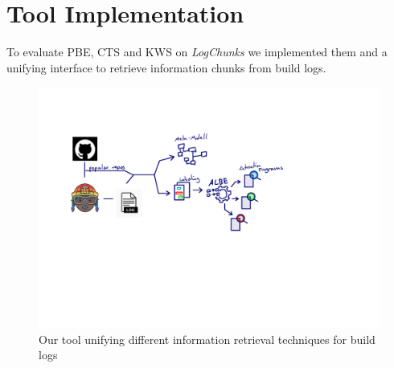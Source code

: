 \documentclass[\myrootdir/main.tex]{subfiles}
\begin{document}
\chapter{Tool Implementation}
\label{sec:implementation}
To evaluate PBE, CTS and KWS on \emph{LogChunks} we implemented them and a unifying interface to retrieve information chunks from build logs.

\begin{figure}[h]
	\centering
	\includegraphics[page=7, width=\textwidth, trim={0.5cm 0.5cm 0.5cm 0.5cm}, clip]{img/flow-of-research.pdf}
	\caption{Our tool unifying different information retrieval techniques for build logs}
	\label{fig:tool}
\end{figure}

\end{document}
